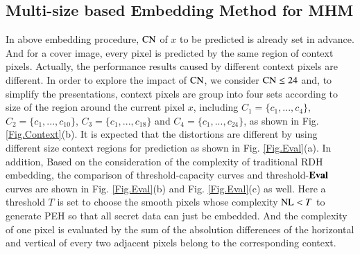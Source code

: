 \documentclass[review,3p,10pt,sort&compress]{elsarticle}
\begin{document}
\subsection{Multi-size based Embedding Method for MHM}\label{sec:3.2}
In above embedding procedure, ${\rm CN}$ of $x$ to be predicted is already set in advance. And for a cover image, every pixel is predicted by the same region of context pixels. Actually, the performance results caused by different context pixels are different. In order to explore the impact of ${\rm CN}$, we consider ${\rm CN} \leq 24$ and, to simplify the presentations, context pixels are group into four sets according to size of the region around the current pixel $x$, including $C_1 = \{c_1, ..., c_4\}$, $C_2 = \{c_1, ..., c_{10}\}$, $C_3 = \{c_1, ..., c_{18}\}$ and $C_4 = \{c_1, ..., c_{24}\}$, as shown in Fig. \ref{Fig.Context}(b). It is expected that the distortions are different by using different size context regions for prediction as shown in Fig. \ref{Fig.Eval}(a). In addition, Based on the consideration of the complexity of traditional RDH embedding, the comparison of threshold-capacity curves and threshold-${\rm \mathbf{Eval}}$ curves are shown in Fig. \ref{Fig.Eval}(b) and Fig. \ref{Fig.Eval}(c) as well. Here a threshold $T$ is set to choose
the smooth pixels whose complexity ${\rm NL} < T$ to generate PEH so that all secret data can just be embedded. And the complexity of one pixel is evaluated by the sum of the absolution differences of the horizontal and vertical of every two adjacent pixels belong to the corresponding context.
\end{document}
